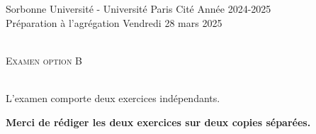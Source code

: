 \documentclass[11pt]{article}
\date{}
\author{}
\theoremstyle{exostyle}
\begin{document}


\noindent 
Sorbonne Universit\'e - Université Paris Cité     \hfill   Ann\'ee 2024-2025 \\
Pr\'eparation \`a  l'agr\'egation        \hfill     Vendredi 28 mars 2025 \\ %
\noindent {\rule{\textwidth}{.2mm}}\\[-5mm]
\begin{center}
  {\large \textsc{Examen option B} }\\[-5mm]
\end{center}
\noindent {\rule{\textwidth}{.2mm}}\\[1cm]

L’examen comporte deux exercices indépendants.

{\bfseries Merci de r\'ediger les deux exercices sur deux copies s\'epar\'ees.}
\end{document}
